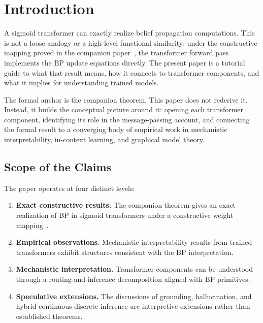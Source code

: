 \section{Introduction}
\label{sec:introduction}

A sigmoid transformer can exactly realize belief propagation
computations. This is not a loose analogy or a high-level functional
similarity: under the constructive mapping proved in the companion
paper~\cite{coppola2026transformers}, the transformer forward pass
implements the BP update equations directly. The present paper is a
tutorial guide to what that result means, how it connects to
transformer components, and what it implies for understanding trained
models.

The formal anchor is the companion theorem. This paper does not
rederive it. Instead, it builds the conceptual picture around it:
opening each transformer component, identifying its role in the
message-passing account, and connecting the formal result to a
converging body of empirical work in mechanistic interpretability,
in-context learning, and graphical model theory.

\subsection*{Scope of the Claims}

The paper operates at four distinct levels:

\begin{enumerate}
\item \textbf{Exact constructive results.} The companion theorem gives
an exact realization of BP in sigmoid transformers under a constructive
weight mapping~\cite{coppola2026transformers}.

\item \textbf{Empirical observations.} Mechanistic interpretability
results from trained transformers exhibit structures consistent with
the BP interpretation.

\item \textbf{Mechanistic interpretation.} Transformer components can
be understood through a routing-and-inference decomposition aligned
with BP primitives.

\item \textbf{Speculative extensions.} The discussions of grounding,
hallucination, and hybrid continuous-discrete inference are
interpretive extensions rather than established theorems.
\end{enumerate}

